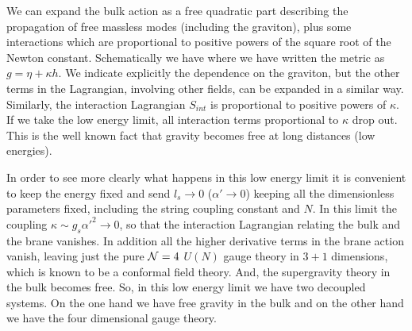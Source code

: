 We can expand the bulk action as a free quadratic part describing the
propagation of free massless modes (including the graviton), plus some
interactions which are proportional to positive powers of the square
root of the Newton constant.  Schematically we have
where we have written the metric as
$g = \eta + \kappa h $. We indicate explicitly
the dependence on the graviton, but the other terms in the Lagrangian,
involving other fields, can be expanded in a similar way.  Similarly,
the interaction Lagrangian $S_{int}$ is proportional to positive powers of
$\kappa $.  If we take the low energy limit, all interaction terms
proportional to $\kappa $ drop out. This is the well known fact that
gravity becomes free at long distances (low energies).  

In order to
see more clearly what happens in this low energy limit it is
convenient to keep the energy fixed and send $l_s \to 0$ ($\alpha' \to
0$) keeping all the dimensionless parameters fixed, including the
string coupling constant and $N$.  In this limit the coupling 
$\kappa \sim g_s
\alpha'^2 \to 0$, so that the interaction Lagrangian relating the bulk
and the brane vanishes. In addition all the higher derivative terms
in the brane action vanish, leaving just the pure ${\cal N} = 4$ $U(N)$
gauge theory in $3+1 $ dimensions, which is known to be a conformal field
theory. And, the supergravity theory in the
bulk becomes free.  So, in this low energy limit we have two decoupled
systems. On the one hand we have free gravity in the bulk and on the
other hand we have the four dimensional gauge theory.  

